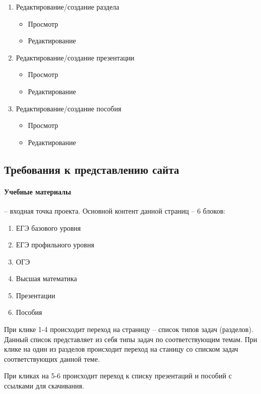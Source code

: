 \begin{enumerate}
  \item Редактирование/создание раздела
  \begin{itemize}
    \item Просмотр
    \item Редактирование
  \end{itemize}

  \item Редактирование/создание презентации
  \begin{itemize}
    \item Просмотр
    \item Редактирование
  \end{itemize}

  \item Редактирование/создание пособия
  \begin{itemize}
    \item Просмотр
    \item Редактирование
  \end{itemize}

\end{enumerate}

\subsection{Требования к представлению сайта}
  \paragraph{Учебные материалы} -- входная точка проекта. Основной контент данной страниц -- 6 блоков:
  \begin{enumerate}
    \item ЕГЭ базового уровня
    \item ЕГЭ профильного уровня
    \item ОГЭ
    \item Высшая математика
    \item Презентации
    \item Пособия
  \end{enumerate}

При клике 1-4 происходит переход на страницу -- список типов задач (разделов). Данный список представляет из себя типы задач по соответствующим темам. При клике на один из разделов происходит переход на станицу со списком задач соответствующих данной теме.

При кликах на 5-6 происходит переход к списку презентаций и пособий с ссылками для скачивания.

